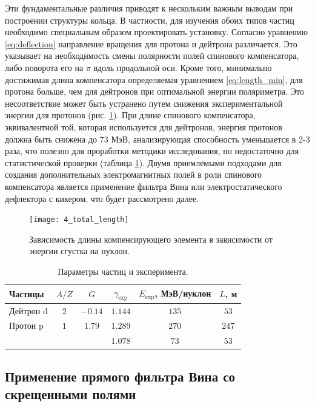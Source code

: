 \par Эти фундаментальные различия приводят к нескольким важным выводам при построении структуры кольца. В частности, для изучения обоих типов частиц необходимо специальным образом проектировать установку. Согласно уравнению \ref{eq:deflection} направление вращения для протона и дейтрона различается. Это указывает на необходимость смены полярности полей спинового компенсатора, либо поворота его на $\pi$ вдоль продольной оси. Кроме того, минимально достижимая длина компенсатора определяемая уравнением \ref{eq:length_min}, для протона больше, чем для дейтронов при оптимальной энергии поляриметра. Это несоответствие может быть устранено путем снижения экспериментальной энергии для протонов (рис. \ref{fig:4_ele_length}). При длине спинового компенсатора, эквивалентной той, которая используется для дейтронов, энергия протонов должна быть снижена до 73 МэВ, анализирующая способность уменьшается в 2-3 раза, что полезно для проработки методики исследования, но недостаточно для статистической проверки (таблица \ref{tab:particles}). Двумя приемлемыми подходами для создания дополнительных электромагнитных полей в роли спинового компенсатора является применение фильтра Вина или электростатического дефлектора с кикером, что будет рассмотрено далее.

\begin{figure}[!h]
	\centering
	\texttt{[image: 4\_total\_length]}
	\caption{Зависимость длины компенсирующего элемента в зависимости от энергии сгустка на нуклон.}
	\label{fig:4_ele_length}
\end{figure}

\begin{table}[!htb]
	\centering
	\caption{Параметры частиц и эксперимента.}
	\label{tab:particles}
	\begin{tabular}{lccccc}
		\toprule
		Частицы & $A/Z$ & $G$     & $\gamma_{\text{exp}}$ & $E_{\text{exp}}$, МэВ/нуклон  & $L$, м \\
		\midrule
		Дейтрон $\text{d}$ & $2$   & $-0.14$ & $1.144$  & $135$ & $53$ \\
		Протон $\text{p}$ & $1$   & $1.79$  & $1.289$ & $270$ & $247$ \\
		&    &   & $1.078$ & $73$ & $53$ \\
		\bottomrule
	\end{tabular}
\end{table}

	\subsection{Применение прямого фильтра Вина со скрещенными полями}


